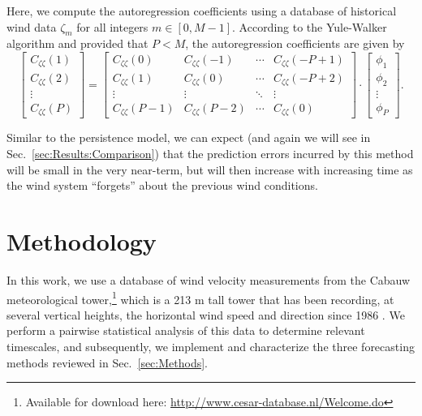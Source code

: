 \documentclass[11pt, oneside]{article}
\newcommand{\secref}[1]{Sec.~\ref{#1}}
\begin{document}
Here, we compute the autoregression coefficients using a database of historical wind data $\zeta_m$ for all integers $m \in [0, M-1]$.
According to the Yule-Walker algorithm and provided that $P < M$, the autoregression coefficients are given by \citep[Sec.~3.1.1]{Chatfield2000}
\begin{equation}
\begin{bmatrix}
C_{\zeta \zeta}(1) \\
C_{\zeta \zeta}(2) \\
\vdots \\
C_{\zeta \zeta}(P)
\end{bmatrix}
=
\begin{bmatrix}
C_{\zeta \zeta}(0) & C_{\zeta \zeta}(-1) & \cdots & C_{\zeta \zeta} (-P+1) \\
C_{\zeta \zeta}(1) & C_{\zeta \zeta}(0) & \cdots & C_{\zeta \zeta} (-P+2) \\
\vdots & \vdots & \ddots & \vdots \\
C_{\zeta \zeta}(P-1) & C_{\zeta \zeta}(P-2) & \cdots & C_{\zeta \zeta}(0)
\end{bmatrix}
\cdot
\begin{bmatrix}
\phi_1 \\
\phi_2 \\
\vdots \\
\phi_P
\end{bmatrix}.
\end{equation}

Similar to the persistence model, we can expect (and again we will see in \secref{sec:Results:Comparison}) that the prediction errors incurred by this method will be small in the very near-term, but will then increase with increasing time as the wind system ``forgets'' about the previous wind conditions.

\section{Methodology}\label{sec:Methodology}
In this work, we use a database of wind velocity measurements from the Cabauw meteorological tower,\footnote{Available for download here: \url{http://www.cesar-database.nl/Welcome.do}} which is a 213 m tall tower that has been recording, at several vertical heights, the horizontal wind speed and direction since 1986 \citep[Table I]{VanUldenWieringa1996}.
We perform a pairwise statistical analysis of this data to determine relevant timescales, and
subsequently, we implement and characterize the three forecasting methods reviewed in \secref{sec:Methods}.
\end{document}

